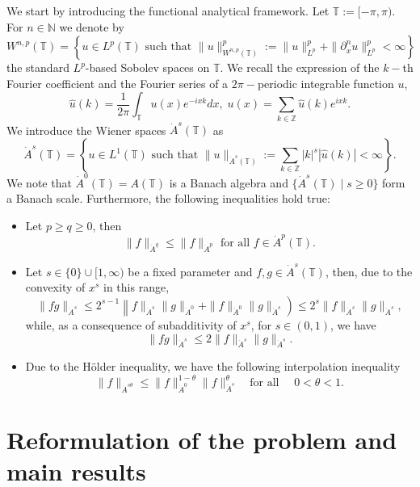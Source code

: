 \documentclass[reqno,11pt]{amsart}
\newcommand{\ZZ}{{\mathbb Z}}
\newcommand{\NN}{{\mathbb N}}
\newcommand{\TT}{{\mathbb T}}
\begin{document}
We  start by introducing the functional analytical framework. Let $\TT:=[-\pi,\pi)$.
For  $n\in \NN$ we denote by
\begin{equation}\label{Sobinhomo2}
W^{n,p}(\TT)=\left\{u\in L^p(\TT)\text{ such that } \|u\|_{W^{n,p}(\TT)}^p:= \|u\|_{L^p}^p+\|\partial_x^n u\|_{L^p}^p<\infty
\right\}
\end{equation}
the standard $L^p$-based Sobolev spaces on $\TT$. We recall the expression of the $k-$th Fourier coefficient and the Fourier series of a $2\pi-$periodic integrable function $u$,
$$
\hat{u}(k)=\frac{1}{2\pi}\int_{\TT}u(x)e^{-ix k}dx,\;u(x)=\sum_{k\in\ZZ}\hat{u}(k)e^{ix k}.
$$
We introduce the Wiener spaces $\dot{A}^s(\TT)$ as
\begin{equation}\label{Wienerinhomo}
\dot{A}^s(\TT)=\left\{u\in L^1(\TT)\text{ such that } \|u\|_{\dot{A}^s(\TT)}:=\sum_{k\in\ZZ} |k|^s|\hat{u}(k)| < \infty\right\}.
\end{equation}
We note that $\dot{A}^0(\TT)=A(\TT)$ is a Banach algebra and $\{\dot{A}^s(\TT)\mid s\geq 0\}$ form a Banach scale. Furthermore, the following inequalities hold true:
\begin{itemize}
\item	Let $p\geq q\geq 0$, then
\begin{equation}
	\label{lem:P}
	\|f\|_{ \dot A^q }\leq \|f\|_{ \dot A^p} \text{ for all } f\in  \dot A^p(\TT).
\end{equation}
\item Let $s\in \{0\}\cup[1,\infty)$ be a fixed parameter and $f,g\in \dot A^s(\TT)$, then, due to the convexity of $x^s$ in this range,
\begin{equation}\label{eq:L21}
\|fg\|_{\dot{A}^s}\leq 2^{s-1}\left\|f\|_{\dot A^s}\|g\|_{\dot A^0}+\|f\|_{\dot A^0}\|g\|_{\dot A^s}\right)\leq  2^{s}\|f\|_{\dot{A}^s}\|g\|_{\dot{A}^s},
\end{equation}
while, as a consequence of subadditivity of $x^s$, for $s\in (0,1)$, we have 
\[
	\|fg\|_{\dot{A}^s}\leq 2\|f\|_{\dot A^s}\|g\|_{\dot A^s}.
\]
\item Due to the H\"older inequality, we have the following interpolation inequality
\begin{equation}\label{interpolation}
\|f\|_{\dot{A}^{s\theta}}\leq \|f\|_{\dot A^0}^{1-\theta}\|f\|_{\dot{A}^{s}}^{\theta}\quad \mbox{for all }\quad 0<\theta<1.
\end{equation}
\end{itemize}


\section{Reformulation of the problem and main results}\label{S:M}
\end{document}
